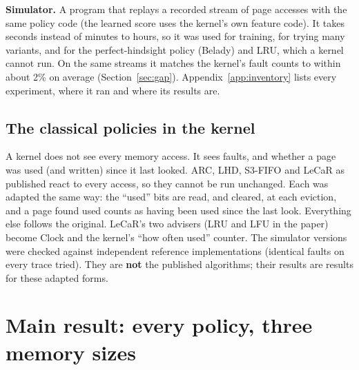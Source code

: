 \documentclass[10.5pt,a4paper]{article}
\begin{document}
\textbf{Simulator.} A program that replays a recorded stream of page accesses with the same policy code (the learned score uses the kernel's own feature code). It takes seconds instead of
minutes to hours, so it was used for training, for trying many variants, and for the perfect-hindsight policy (Belady) and LRU, which a kernel cannot run. On the same streams it matches the kernel's
fault counts to within about 2\% on average (Section~\ref{sec:gap}). Appendix~\ref{app:inventory} lists every experiment, where it ran and where its results are.

\subsection{The classical policies in the kernel}
\label{sec:forms}

A kernel does not see every memory access. It sees faults, and whether a page was used (and written) since it last looked. ARC, LHD, S3-FIFO and LeCaR as published react to every access, so they cannot be
run unchanged. Each was adapted the same way: the ``used'' bits are read, and cleared, at each eviction, and a page found used counts as having been used since the last look.
Everything else follows the original. LeCaR's two advisers (LRU and LFU in the paper) become Clock and the kernel's ``how often used'' counter. The simulator versions were checked against independent reference implementations
(identical faults on every trace tried). They are \textbf{not} the published algorithms; their results are results for these adapted forms.

\section{Main result: every policy, three memory sizes}
\label{sec:main}

\begin{table}[h]
\centering\scriptsize
\resizebox{\linewidth}{!}{}
\caption{5\% memory. Faults relative to Clock in xv6; one column per workload (geometric mean over its streams); last column: mean over the 14 workloads.}
\end{table}
\begin{table}[h]
\centering\scriptsize
\resizebox{\linewidth}{!}{}
\caption{10\% memory, same layout (74 streams).}
\end{table}
\begin{table}[h]
\centering\scriptsize
\resizebox{\linewidth}{!}{}
\caption{20\% memory, same layout.}
\end{table}
\end{document}
